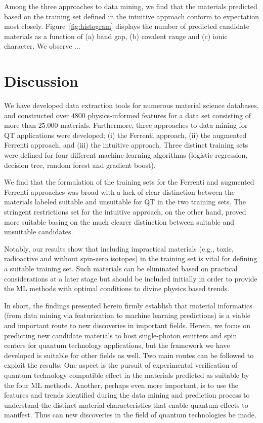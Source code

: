 \documentclass[superscriptaddress,unsortedaddress,
 amsmath,amssymb,
 aps,
]{revtex4-2}
\begin{document}
Among the three approaches to data mining, we find that the materials predicted based on the training set defined in the intuitive approach conform to expectation most closely. Figure~\ref{fig:histogram} displays the number of predicted candidate materials as a function of (a) band gap, (b) covalent range and (c) ionic character. We observe ... 
% 

\section*{Discussion} 
We have developed data extraction tools for numerous material science databases, and constructed over $4800$ physics-informed features for a data set consisting of more than $25.000$ materials. Furthermore, three approaches to data mining for QT applications were developed; (i) the Ferrenti approach,  (ii) the augmented Ferrenti approach, and (iii) the intuitive approach.  
Three distinct training sets were defined for four different machine learning algorithms (logistic regression, decision tree, random forest and gradient boost). 

We find that the formulation of the training sets for the Ferrenti and augmented Ferrenti approaches was broad with a lack of clear distinction between the materials labeled suitable and unsuitable for QT in the two training sets. The stringent restrictions set for the intuitive approach, on the other hand, proved more suitable basing on the much clearer distinction between suitable and unsuitable candidates. 

Notably, our results show that including impractical materials (e.g., toxic, radioactive and without spin-zero isotopes) in the training set is vital for defining a suitable training set. 
Such materials can be eliminated based on practical considerations at a later stage but should be included initially in order to provide the ML methods with optimal conditions to divine physics based trends. 

In short, the findings presented herein firmly establish that material informatics (from data mining via featurization to machine learning predictions) is a viable and important route to new discoveries in important fields.  Herein, we focus on predicting new candidate materials to host single-photon emitters and spin centers for quantum technology applications, but the framework we have developed is suitable for other fields as well. 
Two main routes can be followed to exploit the results. One aspect is the pursuit of experimental verification of quantum technology compatible effect in the materials predicted as suitable by the four ML methods. Another, perhaps even more important, is to use the features and trends identified during the data mining and prediction process to understand the distinct material characteristics that enable quantum effects to manifest. Thus can new discoveries in the field of quantum technologies be made. 
\end{document}
